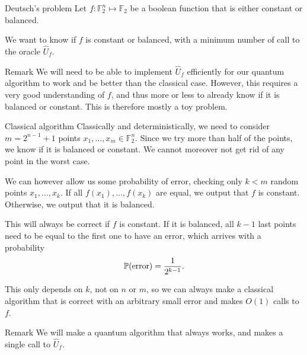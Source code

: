 \documentclass[a4paper]{article}
\begin{document}
\begin{parag}{Deutsch's problem}
    Let $f: \mathbb{F}_2^n \mapsto \mathbb{F}_2$ be a boolean function that is either constant or balanced. 

    We want to know if $f$ is constant or balanced, with a minimum number of call to the oracle $\hat{U}_f$.

    \begin{subparag}{Remark}
        We will need to be able to implement $\hat{U}_f$ efficiently for our quantum algorithm to work and be better than the classical case. However, this requires a very good understanding of $f$, and thus more or less to already know if it is balanced or constant. This is therefore mostly a toy problem.
    \end{subparag}
\end{parag}

\begin{parag}{Classical algorithm}
    Classically and deterministically, we need to consider $m = 2^{n-1} + 1$ points $x_1, \ldots, x_m \in \mathbb{F}_2^n$. Since we try more than half of the points, we know if it is balanced or constant. We cannot moreover not get rid of any point in the worst case.

    We can however allow us some probability of error, checking only $k < m$ random points $x_1, \ldots, x_k$. If all $f\left(x_1\right), \ldots, f\left(x_k\right)$ are equal, we output that $f$ is constant. Otherwise, we output that it is balanced.

    This will always be correct if $f$ is constant. If it is balanced, all $k-1$ last points need to be equal to the first one to have an error, which arrives with a probability
    \[\prob\left(\text{error}\right) = \frac{1}{2^{k-1}}.\]
    
    This only depends on $k$, not on $n$ or $m$, so we can always make a classical algorithm that is correct with an arbitrary small error and makes $O\left(1\right)$ calls to $f$.

    \begin{subparag}{Remark}
        We will make a quantum algorithm that always works, and makes a single call to $\hat{U}_f$.
    \end{subparag}
\end{parag}
\end{document}
